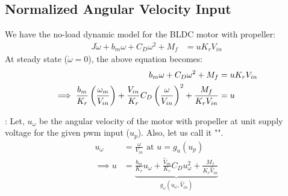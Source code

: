 \subsection{Normalized Angular Velocity Input}

We have the no-load dynamic model for the BLDC motor with propeller:
\begin{align*}
    J \dot \omega + b_m \omega + C_D \omega^2+ M_f &= u K_r V_{in}
\end{align*}
At steady state ($\dot \omega = 0$), the above equation becomes:
\begin{align*}
    b_m \omega + C_D \omega^2 +  M_f &= u K_r V_{in}\\
    \implies \frac{b_m}{K_r} \left(\frac{\omega_m}{V_{in}}\right) + \frac{V_{in}}{K_r} C_D \left( \frac{\omega}{V_{in}} \right)^2 + \frac{M_f}{K_r V_{in}} &= u
\end{align*}

: Let, $u_{\omega}$ be the angular velocity of the motor with propeller at unit supply voltage for the given pwm input ($u_p$). Also, let us call it "".
\begin{align*}
    u_{\omega} &= \frac{\omega}{V_{in}} \text{  at  } u = g_u(u_p)\\
    \implies u &= \underbrace{\frac{b_m}{K_r} u_\omega + \frac{\hat V_{in}}{K_r} C_D u_\omega^2 + \frac{M_f}{K_r  \hat V_{in}}}_{g_\omega (u_\omega, \hat V_{in})}
\end{align*}

